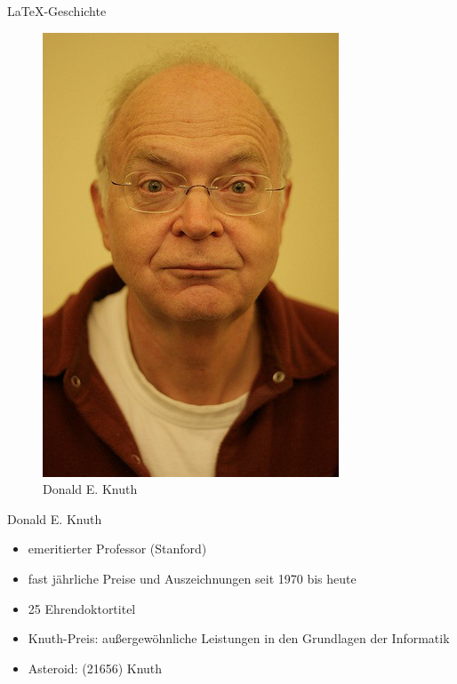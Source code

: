 \begin{frame}{\LaTeX-Geschichte}
\begin{figure}[htbp]
\centering
\includegraphics[width=\textwidth*0.8,height=\textheight*0.8,keepaspectratio]{../../img/knuth.jpg}
\caption{Donald E. Knuth}
\end{figure}

\end{frame}

\begin{frame}{Donald E. Knuth}

\begin{itemize}
\itemsep1pt\parskip0pt
\item
  emeritierter Professor (Stanford)
\item
  fast jährliche Preise und Auszeichnungen seit 1970 bis heute
\item
  25 Ehrendoktortitel
\item
  Knuth-Preis: außergewöhnliche Leistungen in den Grundlagen der
  Informatik
\item
  Asteroid: (21656) Knuth
\end{itemize}

\end{frame}

